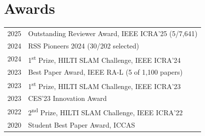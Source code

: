 \documentclass[]{deedy-resume-openfont}
\begin{document}
\begin{minipage}[t]{0.66\textwidth}
\section{Awards}
\begin{tabular}{rl}
2025 & Outstanding Reviewer Award, IEEE ICRA'25 (5/7,641) \\
2024 & RSS Pioneers 2024 (30/202 selected) \\
2024 & 1\textsuperscript{st} Prize, HILTI SLAM Challenge, IEEE ICRA'24 \\
2023 & Best Paper Award, IEEE RA-L (5 of 1,100 papers) \\
2023 & 1\textsuperscript{st} Prize, HILTI SLAM Challenge, IEEE ICRA'23 \\
2023 & CES'23 Innovation Award \\
2022 & 2\textsuperscript{nd} Prize, HILTI SLAM Challenge, IEEE ICRA'22 \\
2020 & Student Best Paper Award, ICCAS \\
\end{tabular}
\sectionsep

\end{minipage}
\end{document}
